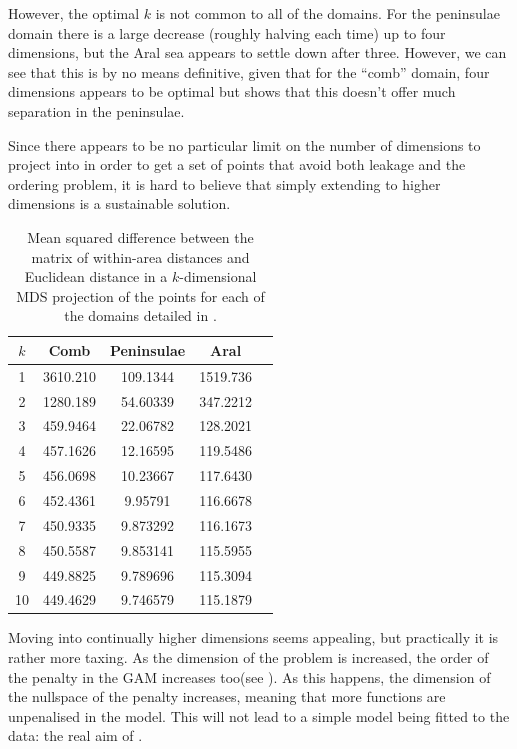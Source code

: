 {However, the optimal $k$ is not common to all of the domains. For the peninsulae domain there is a large decrease (roughly halving each time) up to four dimensions, but the Aral sea appears to settle down after three. However, we can see that this is by no means definitive, given that for the ``comb'' domain, four dimensions appears to be optimal but  shows that this doesn't offer much separation in the peninsulae.

Since there appears to be no particular limit on the number of dimensions to project into in order to get a set of points that avoid both leakage and the ordering problem, it is hard to believe that simply extending to higher dimensions is a sustainable solution.

\begin{table}[htb]
\centering
\begin{tabular}{c c c c c}
$k$ & Comb  & Peninsulae & Aral\\ 
\hline
1  &  3610.210  &  109.1344  &  1519.736 \\ 
2  &  1280.189  &  54.60339  &  347.2212 \\ 
3  &  459.9464  &  22.06782  &  128.2021 \\ 
4  &  457.1626  &  12.16595  &  119.5486 \\ 
5  &  456.0698  &  10.23667  &  117.6430 \\ 
6  &  452.4361  &  9.95791  &  116.6678 \\ 
7  &  450.9335  &  9.873292  &  116.1673 \\ 
8  &  450.5587  &  9.853141  &  115.5955 \\ 
9  &  449.8825  &  9.789696  &  115.3094 \\ 
10  &  449.4629 &  9.746579  &  115.1879 \\ 
\end{tabular}
\caption{Mean squared difference between the matrix of within-area distances and Euclidean distance in a $k$-dimensional MDS projection of the points for each of the domains detailed in .}
\label{increasek}
\end{table}

Moving into continually higher dimensions seems appealing, but practically it is rather more taxing. As the dimension of the problem is increased, the order of the penalty in the GAM increases too(see ). As this happens, the dimension of the nullspace of the penalty increases, meaning that more functions are unpenalised in the model. This will not lead to a simple model being fitted to the data: the real aim of \mdsap.


}
